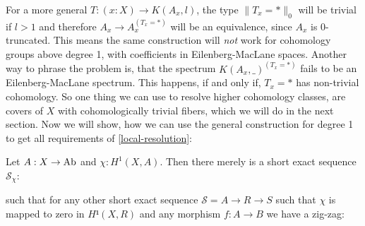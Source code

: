 For a more general $T:(x:X)\to K(A_x,l)$,
the type $\|T_x=\ast\|_0$ will be trivial if $l>1$ and therefore $A_x\to A_x^{(T_x=\ast)}$ will be an equivalence,
since $A_x$ is 0-truncated.
This means the same construction will \emph{not} work for cohomology groups above degree 1,
with coefficients in Eilenberg-MacLane spaces.
Another way to phrase the problem is,
that the spectrum $K(A_x,\_)^{(T_x=\ast)}$ fails to be an Eilenberg-MacLane spectrum.
This happens, if and only if, ${T_x=\ast}$ has non-trivial cohomology.
So one thing we can use to resolve higher cohomology classes, are covers of $X$ with cohomologically trivial fibers,
which we will do in the next section.
Now we will show, how we can use the general construction for degree 1 to get all requirements of \cref{local-resolution}:

\begin{lemma}
  \label{general-1-resolution-exists}
  Let $A:X\to\operatorname{Ab}$ and $\chi:H^1(X,A)$.
  Then there merely is a short exact sequence $\mathcal{S}_\chi$:
  \begin{center}
  \end{center}
  such that for any other short exact sequence $\mathcal{S}=A\to R\to S$
  such that $\chi$ is mapped to zero in $H¹(X,R)$ and any morphism $f:A\to B$ we have
  a zig-zag:
  \begin{center}
  \end{center}
\end{lemma}

